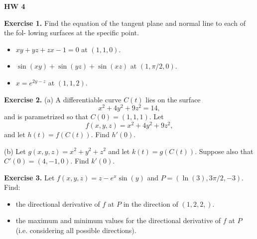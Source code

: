 \documentclass{article}
\begin{document}

\textbf{HW 4}

\textbf{Exercise 1.} Find the equation of the tangent plane and normal line to each of the fol-
lowing surfaces at the specific point.
\begin{itemize}
    \item $xy+yz+zx-1=0$ at $(1,1,0)$.
    \item $\sin(xy) + \sin(yz) + \sin(xz)$ at $(1,\pi/2,0)$.
    \item $x=e^{2y-z}$ at $(1,1,2)$.
\end{itemize}

\textbf{Exercise 2.} 
(a) A differentiable curve $C(t)$ lies on the surface
\[x^2 + 4y^2 + 9z^2 = 14,\]
and is parametrized so that $C(0) = (1,1,1)$. Let 
\[f(x,y,z) = x^2 + 4y^2 + 9z^2,\]
and let $h(t) = f(C(t))$. Find $h'(0)$.

(b) Let $g(x,y,z) = x^2 + y^2 + z^2$ and let $k(t) = g(C(t))$.
Suppose also that $C'(0)=(4,-1,0)$. Find $k'(0)$.

\textbf{Exercise 3.} 
Let $f(x,y,z) = z - e^x \sin(y)$ and $P=(\ln(3), 3\pi/2, -3)$.
Find:
\begin{itemize}
    \item the directional derivative of $f$ at $P$ in the direction of $(1,2,2,)$.
    \item the maximum and minimum values for the directional derivative of $f$ at $P$ (i.e. considering all possible directions).
\end{itemize}
\end{document}
